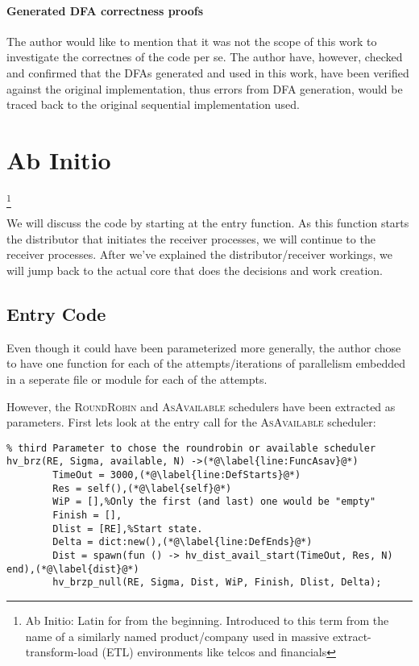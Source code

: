 \paragraph{Generated DFA correctness proofs}

The author would like to mention that it was not the scope of this work
to investigate the correctnes of the code per se. The author have,
however, checked and confirmed that the DFAs generated and used in
this work, have been verified against the original implementation,
thus errors from DFA generation, would be traced back to the original
sequential implementation used.

\section{Ab Initio}\footnote{Ab Initio: Latin for from the
  beginning. Introduced to this term from the name of a similarly
  named product/company used in massive extract-transform-load (ETL)
  environments like telcos and financials}

We will discuss the code by starting at the entry function. As this
function starts the distributor that initiates the receiver processes,
we will continue to the receiver processes. After we've explained the
distributor/receiver workings, we will jump back to the actual core
that does the decisions and work creation.


\subsection{Entry Code}

Even though it could have been parameterized more generally, the author
chose to have one function for each of the attempts/iterations of
parallelism embedded in a seperate file or module for each of the attempts.
 
However, the \textsc{RoundRobin} and \textsc{AsAvailable} schedulers have been extracted
as parameters. First lets look at the entry call for the \textsc{AsAvailable} scheduler:
\begin{lstlisting}[name=hvp2]
%The entry to hvp2
% third Parameter to chose the roundrobin or available scheduler
hv_brz(RE, Sigma, available, N) ->(*@\label{line:FuncAsav}@*)
		TimeOut = 3000,(*@\label{line:DefStarts}@*)
		Res = self(),(*@\label{self}@*)
		WiP = [],%Only the first (and last) one would be "empty"
		Finish = [],
		Dlist = [RE],%Start state.
		Delta = dict:new(),(*@\label{line:DefEnds}@*)
		Dist = spawn(fun () -> hv_dist_avail_start(TimeOut, Res, N)		 end),(*@\label{dist}@*)
		hv_brzp_null(RE, Sigma, Dist, WiP, Finish, Dlist, Delta);
\end{lstlisting}

